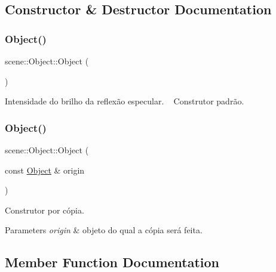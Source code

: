 \subsection{Constructor \& Destructor Documentation}
\mbox{\label{classscene_1_1_object_abba9ed18d83499faa00c6692566d1099}} 
\subsubsection{\texorpdfstring{Object()}{Object()}\hspace{0.1cm}{\footnotesize\ttfamily [1/2]}}
{\footnotesize\ttfamily scene\+::\+Object\+::\+Object (\begin{DoxyParamCaption}{ }\end{DoxyParamCaption})\hspace{0.3cm}{\ttfamily [inline]}}

Intensidade do brilho da reflexão especular. ~\newline
Construtor padrão. \mbox{\label{classscene_1_1_object_a423efa99f61b720b2ad7636ef921c92a}} 
\subsubsection{\texorpdfstring{Object()}{Object()}\hspace{0.1cm}{\footnotesize\ttfamily [2/2]}}
{\footnotesize\ttfamily scene\+::\+Object\+::\+Object (\begin{DoxyParamCaption}\item[{const \mbox{\hyperlink{classscene_1_1_object}{Object}} \&}]{origin }\end{DoxyParamCaption})\hspace{0.3cm}{\ttfamily [inline]}}

Construtor por cópia. 
\begin{DoxyParams}{Parameters}
{\em origin} & objeto do qual a cópia será feita. \\
\hline
\end{DoxyParams}


\subsection{Member Function Documentation}
\mbox{\label{classscene_1_1_object_a30b47bcd40234142c873a8ccef3d8d17}} 
